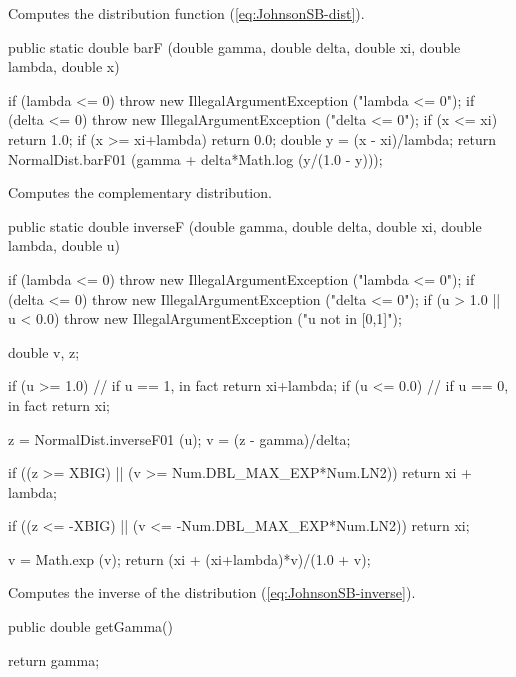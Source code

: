  \begin{tabb}
  Computes the distribution function (\ref{eq:JohnsonSB-dist}).
 \end{tabb}
\begin{code}

   public static double barF (double gamma, double delta,
                              double xi, double lambda, double x)\begin{hide} {
      if (lambda <= 0)
         throw new IllegalArgumentException ("lambda <= 0");
      if (delta <= 0)
         throw new IllegalArgumentException ("delta <= 0");
      if (x <= xi)
         return 1.0;
      if (x >= xi+lambda)
         return 0.0;
      double y = (x - xi)/lambda;
      return NormalDist.barF01 (gamma + delta*Math.log (y/(1.0 - y)));
   }\end{hide}
\end{code}
  \begin{tabb}
  Computes the complementary distribution.
 \end{tabb}
\begin{code}

   public static double inverseF (double gamma, double delta,
                                  double xi, double lambda, double u)\begin{hide} {
      if (lambda <= 0)
         throw new IllegalArgumentException ("lambda <= 0");
      if (delta <= 0)
         throw new IllegalArgumentException ("delta <= 0");
      if (u > 1.0 || u < 0.0)
          throw new IllegalArgumentException ("u not in [0,1]");

      double v, z;

      if (u >= 1.0)    // if u == 1, in fact
          return xi+lambda;
      if (u <= 0.0)    // if u == 0, in fact
          return xi;

      z = NormalDist.inverseF01 (u);
      v = (z - gamma)/delta;

      if ((z >= XBIG) || (v >= Num.DBL_MAX_EXP*Num.LN2))
            return xi + lambda;

        if ((z <= -XBIG) || (v <= -Num.DBL_MAX_EXP*Num.LN2))
            return xi;

        v = Math.exp (v);
        return (xi + (xi+lambda)*v)/(1.0 + v);
   }\end{hide}
\end{code}
  \begin{tabb}
  Computes the inverse of the distribution (\ref{eq:JohnsonSB-inverse}).
 \end{tabb}
\begin{code}

   public double getGamma()\begin{hide} {
      return gamma;
   }\end{hide}
\end{code}
